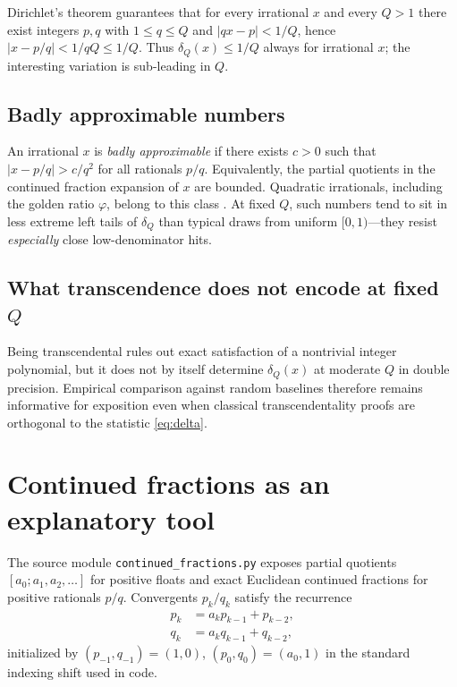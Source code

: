\documentclass[
]{article}
\begin{document}
Dirichlet's theorem guarantees that for every irrational \(x\) and every
\(Q>1\) there exist integers \(p,q\) with \(1 \leq q \leq Q\) and
\(|qx - p| < 1/Q\), hence \(|x - p/q| < 1/qQ \leq 1/Q\). Thus
\(\delta_Q(x) \leq 1/Q\) always for irrational \(x\); the interesting
variation is sub-leading in \(Q\).

\subsection{Badly approximable
numbers}\label{badly-approximable-numbers}

An irrational \(x\) is \emph{badly approximable} if there exists \(c>0\)
such that \(|x - p/q| > c/q^2\) for all rationals \(p/q\). Equivalently,
the partial quotients in the continued fraction expansion of \(x\) are
bounded. Quadratic irrationals, including the golden ratio \(\varphi\),
belong to this class \citep{cassels1957}. At fixed \(Q\), such numbers
tend to sit in less extreme left tails of \(\delta_Q\) than typical
draws from uniform \([0,1)\)---they resist \emph{especially} close
low-denominator hits.

\subsection{\texorpdfstring{What transcendence does not encode at fixed
\(Q\)}{What transcendence does not encode at fixed Q}}\label{what-transcendence-does-not-encode-at-fixed-q}

Being transcendental rules out exact satisfaction of a nontrivial
integer polynomial, but it does not by itself determine \(\delta_Q(x)\)
at moderate \(Q\) in double precision. Empirical comparison against
random baselines therefore remains informative for exposition even when
classical transcendentality proofs are orthogonal to the statistic
\eqref{eq:delta}.

\newpage

\section{Continued fractions as an explanatory
tool}\label{continued-fractions-as-an-explanatory-tool}

The source module \texttt{continued\_fractions.py} exposes partial
quotients \([a_0; a_1, a_2, \ldots]\) for positive floats and exact
Euclidean continued fractions for positive rationals \(p/q\).
Convergents \(p_k/q_k\) satisfy the recurrence \begin{align}
p_k &= a_k p_{k-1} + p_{k-2}, \\
q_k &= a_k q_{k-1} + q_{k-2},
\end{align} initialized by \((p_{-1},q_{-1})=(1,0)\),
\((p_0,q_0)=(a_0,1)\) in the standard indexing shift used in code.
\end{document}
